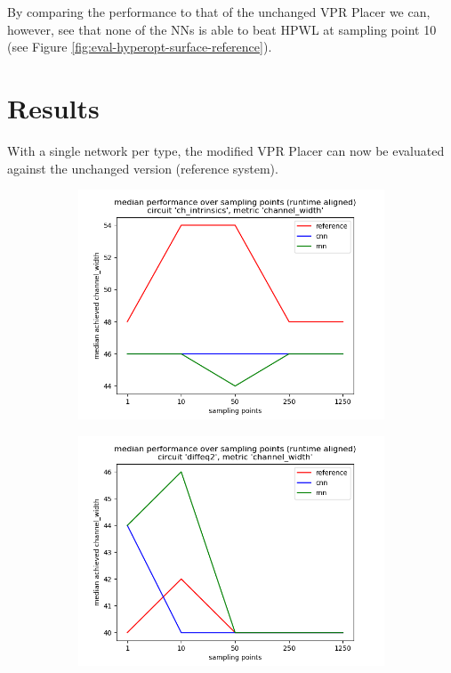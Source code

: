 By comparing the performance to that of the unchanged \gls{VPR} Placer we can, however, see that none of the \glspl{NN} is able to beat \gls{HPWL} at sampling point 10 (see Figure \ref{fig:eval-hyperopt-surface-reference}).

\section{Results}

With a single network per type, the modified \gls{VPR} Placer can now be evaluated against the unchanged version (reference system).

\begin{figure}
	\centering
	\begin{subfigure}[b]{0.49\linewidth}
		\includegraphics[width=\linewidth]{plots/eval-ch_intrinsics-chan-width-median-full.png}
	\end{subfigure}
	\begin{subfigure}[b]{0.49\linewidth}
		\includegraphics[width=\linewidth]{plots/eval-diffeq2-chan-width-median-full.png}

\end{subfigure}
\end{figure}

